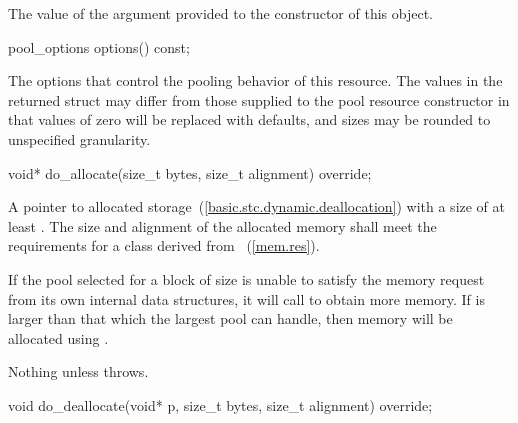 \begin{itemdescr}
\pnum
\returns
The value of the  argument
provided to the constructor of this object.
\end{itemdescr}

%
%
\begin{itemdecl}
pool_options options() const;
\end{itemdecl}

\begin{itemdescr}
\pnum
\returns
The options that control the pooling behavior of this resource.
The values in the returned struct may differ
from those supplied to the pool resource constructor in that
values of zero will be replaced with 
defaults, and sizes may be rounded to unspecified granularity.
\end{itemdescr}

%
%
\begin{itemdecl}
void* do_allocate(size_t bytes, size_t alignment) override;
\end{itemdecl}

\begin{itemdescr}
\pnum
\returns
A pointer to allocated storage~(\ref{basic.stc.dynamic.deallocation})
with a size of at least .
The size and alignment of the allocated memory shall meet the requirements
for a class derived from ~(\ref{mem.res}).

\pnum
\effects
If the pool selected for a block of size 
is unable to satisfy the memory request from its own internal data structures,
it will call  to obtain more memory.
If  is larger than that which the largest pool can handle,
then memory will be allocated using .

\pnum
\throws
Nothing unless  throws.
\end{itemdescr}

%
%
\begin{itemdecl}
void do_deallocate(void* p, size_t bytes, size_t alignment) override;
\end{itemdecl}

